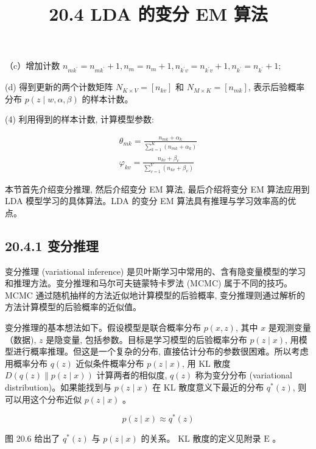 \documentclass[10pt]{article}
\title{20.4 LDA 的变分 EM 算法 }
\author{}
\date{}
\begin{document}
\begin{CJK*}{UTF8}{bsmi}
\maketitle
（c）增加计数 $n_{m k^{\prime}}=n_{m k^{\prime}}+1, n_{m}=n_{m}+1, n_{k^{\prime} v}=n_{k^{\prime} v}+1, n_{k^{\prime}}=n_{k^{\prime}}+1$;

(d) 得到更新的两个计数矩阵 $N_{K \times V}=\left[n_{k v}\right]$ 和 $N_{M \times K}=\left[n_{m k}\right]$, 表示后验概率分布 $p(z \mid w, \alpha, \beta)$ 的样本计数。

(4) 利用得到的样本计数, 计算模型参数:

$$
\begin{array}{r}
\theta_{m k}=\frac{n_{m k}+\alpha_{k}}{\sum_{k=1}^{K}\left(n_{m k}+\alpha_{k}\right)} \\
\varphi_{k v}=\frac{n_{k v}+\beta_{v}}{\sum_{v=1}^{V}\left(n_{k v}+\beta_{v}\right)}
\end{array}
$$

本节首先介绍变分推理, 然后介绍变分 EM 算法, 最后介绍将变分 EM 算法应用到 LDA 模型学习的具体算法。LDA 的变分 EM 算法具有推理与学习效率高的优点。

\subsection*{20.4.1 变分推理}
变分推理 (variational inference) 是贝叶斯学习中常用的、含有隐变量模型的学习和推理方法。变分推理和马尔可夫链蒙特卡罗法 (MCMC) 属于不同的技巧。MCMC 通过随机抽样的方法近似地计算模型的后验概率, 变分推理则通过解析的方法计算模型的后验概率的近似值。

变分推理的基本想法如下。假设模型是联合概率分布 $p(x, z)$, 其中 $x$ 是观测变量（数据), $z$ 是隐变量, 包括参数。目标是学习模型的后验概率分布 $p(z \mid x)$, 用模型进行概率推理。但这是一个复杂的分布, 直接估计分布的参数很困难。所以考虑用概率分布 $q(z)$ 近似条件概率分布 $p(z \mid x)$, 用 $\mathrm{KL}$ 散度 $D(q(z) \| p(z \mid x))$ 计算两者的相似度, $q(z)$ 称为变分分布 (variational distribution)。如果能找到与 $p(z \mid x)$ 在 KL 散度意义下最近的分布 $q^{*}(z)$, 则可以用这个分布近似 $p(z \mid x)$ 。


\begin{equation*}
p(z \mid x) \approx q^{*}(z) \tag{20.34}
\end{equation*}


图 20.6 给出了 $q^{*}(z)$ 与 $p(z \mid x)$ 的关系。 $\mathrm{KL}$ 散度的定义见附录 $\mathrm{E}$ 。


\end{CJK*}
\end{document}

